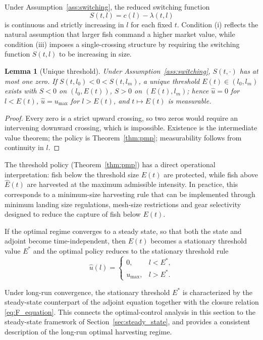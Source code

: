 \documentclass[pdflatex,sn-mathphys-num]{sn-jnl}
\theoremstyle{thmstyleone}
\newtheorem{lemma}[theorem]{Lemma}
\theoremstyle{definition}
\theoremstyle{remark}
\begin{document}
Under Assumption~\ref{ass:switching}, the reduced switching function
\[
S(t,l)=c(l)-\lambda(t,l)
\]
is continuous and strictly increasing in $l$ for each fixed $t$. Condition
(i) reflects the natural assumption that larger fish command a higher market
value, while condition (iii) imposes a single-crossing structure by requiring
the switching function $S(t,l)$ to be increasing in size.

\begin{lemma}[Unique threshold]\label{lem:cross}
Under Assumption~\ref{ass:switching}, $S(t,\cdot)$ has at most one zero. If
$S(t,l_0)<0<S(t,l_m)$, a unique threshold $E(t)\in(l_0,l_m)$ exists with $S<0$
on $(l_0,E(t))$, $S>0$ on $(E(t),l_m)$; hence $\hat u=0$ for $l<E(t)$, $\hat u=u_{\max}$
for $l>E(t)$, and $t\mapsto \hat E(t)$ is measurable.
\end{lemma}
\begin{proof}
Every zero is a strict upward crossing, so two zeros would require an intervening
downward crossing, which is impossible. Existence is the intermediate value theorem; the
policy is Theorem~\ref{thm:pmp}; measurability follows from continuity in $l$.
\end{proof}

The threshold policy (Theorem~\ref{thm:pmp}) has a direct operational
interpretation: fish below the threshold size $E(t)$ are protected, while fish
above $\hat E(t)$ are harvested at the maximum admissible intensity.
In practice, this corresponds to a minimum-size harvesting rule that can be
implemented through minimum landing size regulations, mesh-size restrictions and
gear selectivity designed to reduce the capture of fish below $ E(t)$.

If the optimal regime converges to a steady state, so that both the state and
adjoint become time-independent, then $E(t)$ becomes a stationary threshold value $E^*$ and the optimal policy
reduces to the stationary threshold rule
\begin{equation}\label{eq:threshold_policy_stationary}
\hat u(l)=
\begin{cases}
0, & l<E^*,\\[4pt]
u_{\max}, & l>E^*.
\end{cases}
\end{equation}

Under long-run convergence, the stationary threshold $E^*$ is characterized by
the steady-state counterpart of the adjoint equation together with the closure
relation \eqref{eq:F_equation}. This connects the optimal-control analysis in this section to the steady-state framework of Section~\ref{sec:steady_state}, and provides a consistent description of the
long-run optimal harvesting regime.
\end{document}
